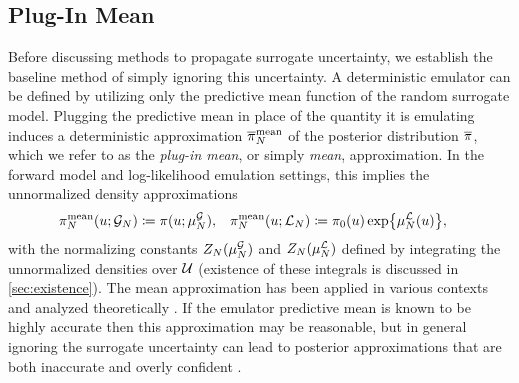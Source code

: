 \documentclass[12pt]{article}
\begin{document}
\subsection{Plug-In Mean}
Before discussing methods to propagate surrogate uncertainty, we establish the baseline method of simply 
ignoring this uncertainty. A deterministic emulator can be defined by utilizing only the predictive mean function
of the random surrogate model. Plugging the predictive mean in place of the quantity it is emulating induces 
a deterministic approximation $\postApproxNormMean[\Ndesign]$ of the posterior distribution 
$\postDensNorm$, which we refer to as the \textit{plug-in mean}, or simply \textit{mean}, approximation. 
In the forward model and log-likelihood emulation settings, this implies the unnormalized density approximations 
\begin{align}
&\postApproxMean[\Ndesign](\Par; \fwdEm[\Ndesign]) \Def \postDens(\Par; \emMean[\Ndesign]{\fwd}), \label{eq:mean-approx-fwd}
&&\postApproxMean[\Ndesign](\Par; \llikEm[\Ndesign]) \Def \priorDens(\Par) \Exp{\emMean[\Ndesign]{\llik}(\Par)}, \label{eq:mean-approx_llik}
\end{align}
with the normalizing constants $\normCstEm(\emMean[\Ndesign]{\fwd})$ and 
$\normCstEm(\emMean[\Ndesign]{\llik})$ defined by integrating the unnormalized densities over $\parSpace$
(existence of these integrals is discussed in \cref{sec:existence}).
The mean approximation has been applied in various contexts
\citep{VehtariParallelGP,trainDynamics,emPostDens,BurknerSurrogate,CLMBayesianCalibration} and analyzed
theoretically 
\citep{StuartTeck1,StuartTeck2,random_fwd_models,TeckHyperpar,gp_surrogates_random_exploration}.
If the emulator predictive mean is known to be highly accurate then this approximation may be reasonable,
but in general ignoring the surrogate uncertainty can lead to posterior approximations that are 
both inaccurate and overly confident \citep{BurknerSurrogate}. 
\end{document}
